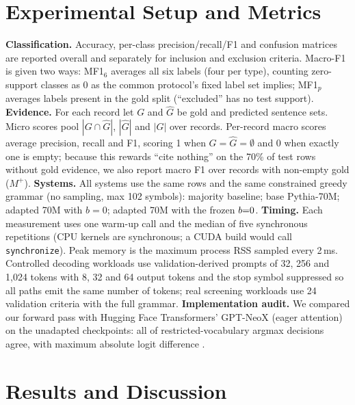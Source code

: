 \section{Experimental Setup and Metrics}
\textbf{Classification.} Accuracy, per-class precision/recall/F1 and confusion matrices are reported overall and separately for inclusion and exclusion criteria. Macro-F1 is given two ways: MF1$_6$ averages all six labels (four per type), counting zero-support classes as 0 as the common protocol's fixed label set implies; MF1$_p$ averages labels present in the gold split (``excluded'' has no test support). \textbf{Evidence.} For each record let $G$ and $\hat G$ be gold and predicted sentence sets. Micro scores pool $|G\cap\hat G|$, $|\hat G|$ and $|G|$ over records. Per-record macro scores average precision, recall and F1, scoring 1 when $G=\hat G=\emptyset$ and 0 when exactly one is empty; because this rewards ``cite nothing'' on the 70\% of test rows without gold evidence, we also report macro F1 over records with non-empty gold ($M^{+}$). \textbf{Systems.} All systems use the same rows and the same constrained greedy grammar (no sampling, max 102 symbols): majority baseline; base Pythia-70M; adapted 70M with $b{=}0$; adapted 70M with the frozen $b{=}0$. \textbf{Timing.} Each measurement uses one warm-up call and the median of five synchronous repetitions (CPU kernels are synchronous; a CUDA build would call \texttt{synchronize}). Peak memory is the maximum process RSS sampled every 2\,ms. Controlled decoding workloads use validation-derived prompts of 32, 256 and 1,024 tokens with 8, 32 and 64 output tokens and the stop symbol suppressed so all paths emit the same number of tokens; real screening workloads use 24 validation criteria with the full grammar. \textbf{Implementation audit.} We compared our forward pass with Hugging Face Transformers' GPT-NeoX (eager attention) on the unadapted checkpoints: all \AuditPositions{} of \AuditTotal{} restricted-vocabulary argmax decisions agree, with maximum absolute logit difference \AuditMax{}.

\section{Results and Discussion}\label{sec:results}


